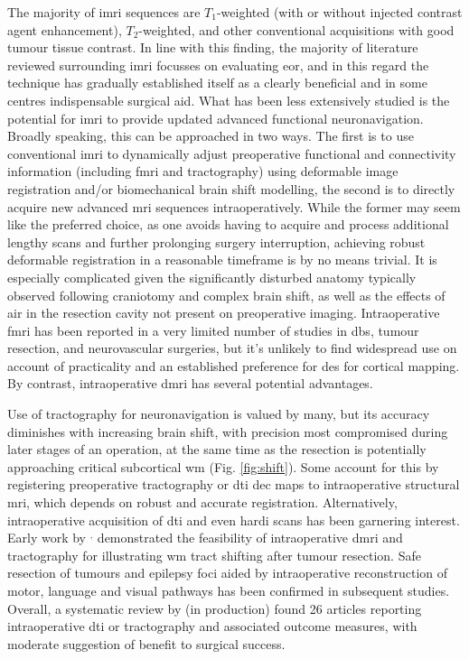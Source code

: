 \documentclass[12pt,phd,a4paper,twoside]{ucl_thesis}
\renewcommand{\textcite}[2][]{
\ifthenelse { \equal {#1} {} }  {\citeauthor{#2}\autocite{#2}}   {\citeauthor{#1}\autocite{#2}}}
\begin{document}
The majority of \gls{imri} sequences are $T_1$-weighted (with or without injected contrast agent enhancement), $T_2$-weighted, and other conventional acquisitions with good tumour tissue contrast\autocite{Kubben2011,Coburger2019}.
In line with this finding, the majority of literature reviewed surrounding \gls{imri} focusses on evaluating \gls{eor}, and in this regard the technique has gradually established itself as a clearly beneficial and in some centres indispensable surgical aid\autocite{Garzon-Muvdi2019,Hlavac2020}.
What has been less extensively studied is the potential for \gls{imri} to provide updated advanced functional neuronavigation.
Broadly speaking, this can be approached in two ways.
The first is to use conventional \gls{imri} to dynamically adjust preoperative functional and connectivity information (including \gls{fmri} and tractography) using deformable image registration and/or biomechanical brain shift modelling, the second is to directly acquire new advanced \gls{mri} sequences intraoperatively.
While the former may seem like the preferred choice, as one avoids having to acquire and process additional lengthy scans and further prolonging surgery interruption, achieving robust deformable registration in a reasonable timeframe is by no means trivial.
It is especially complicated given the significantly disturbed anatomy typically observed following craniotomy and complex brain shift, as well as the effects of air in the resection cavity not present on preoperative imaging.
Intraoperative \gls{fmri} has been reported in a very limited number of studies in \gls{dbs}\autocite{Hiss2015,Knight2015}, tumour resection\autocite{Roder2016a,Qiu2017a}, and neurovascular\autocite{Muscas2019} surgeries, but it's unlikely to find widespread use on account of practicality and an established preference for \gls{des} for cortical mapping.
By contrast, intraoperative \gls{dmri} has several potential advantages.

Use of tractography for neuronavigation is valued by many, but its accuracy diminishes with increasing brain shift, with precision most compromised during later stages of an operation, at the same time as the resection is potentially approaching critical subcortical \gls{wm}\autocite{Yang2019} (Fig. \ref{fig:shift}).
Some account for this by registering preoperative tractography or \gls{dti} \gls{dec} maps to intraoperative structural \gls{mri}\autocite{Nimsky2006a,Tamura2022}, which depends on robust and accurate registration\autocite{Beare2016}.
Alternatively, intraoperative acquisition of \gls{dti} and even \gls{hardi} scans has been garnering interest.
Early work by \textcite{Nimsky2005}$^,$\autocite{Nimsky2005a} demonstrated the feasibility of intraoperative \gls{dmri} and tractography for illustrating \gls{wm} tract shifting after tumour resection.
Safe resection of tumours and epilepsy foci aided by intraoperative reconstruction of motor\autocite{Maesawa2010,Javadi2017}, language\autocite{DAndrea2016,Li2021} and visual\autocite{Daga2012,Cui2015} pathways has been confirmed in subsequent studies.
Overall, a systematic review by \citeauthor{Aylmore} (in production)\autocite{Aylmore} found 26 articles reporting intraoperative \gls{dti} or tractography and associated outcome measures, with moderate suggestion of benefit to surgical success.
\end{document}

